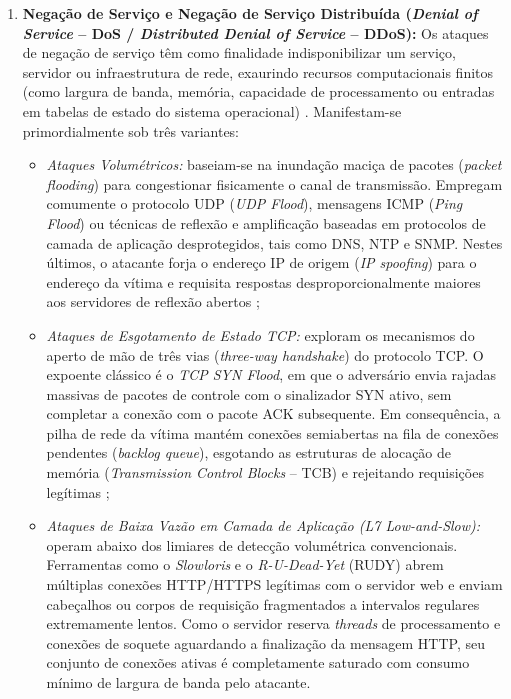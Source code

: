 \begin{enumerate}
    \item \textbf{Negação de Serviço e Negação de Serviço Distribuída (\emph{Denial of Service} -- DoS / \emph{Distributed Denial of Service} -- DDoS):}
    Os ataques de negação de serviço têm como finalidade indisponibilizar um serviço, servidor ou infraestrutura de rede, exaurindo recursos computacionais finitos (como largura de banda, memória, capacidade de processamento ou entradas em tabelas de estado do sistema operacional) \cite{Sharafaldin2018TowardGA}. Manifestam-se primordialmente sob três variantes:
    \begin{itemize}
        \item \emph{Ataques Volumétricos:} baseiam-se na inundação maciça de pacotes (\emph{packet flooding}) para congestionar fisicamente o canal de transmissão. Empregam comumente o protocolo UDP (\emph{UDP Flood}), mensagens ICMP (\emph{Ping Flood}) ou técnicas de reflexão e amplificação baseadas em protocolos de camada de aplicação desprotegidos, tais como DNS, NTP e SNMP. Nestes últimos, o atacante forja o endereço IP de origem (\emph{IP spoofing}) para o endereço da vítima e requisita respostas desproporcionalmente maiores aos servidores de reflexão abertos \cite{ciciot2023};
        \item \emph{Ataques de Esgotamento de Estado TCP:} exploram os mecanismos do aperto de mão de três vias (\emph{three-way handshake}) do protocolo TCP. O expoente clássico é o \emph{TCP SYN Flood}, em que o adversário envia rajadas massivas de pacotes de controle com o sinalizador SYN ativo, sem completar a conexão com o pacote ACK subsequente. Em consequência, a pilha de rede da vítima mantém conexões semiabertas na fila de conexões pendentes (\emph{backlog queue}), esgotando as estruturas de alocação de memória (\emph{Transmission Control Blocks} -- TCB) e rejeitando requisições legítimas \cite{Sharafaldin2018TowardGA};
        \item \emph{Ataques de Baixa Vazão em Camada de Aplicação (L7 Low-and-Slow):} operam abaixo dos limiares de detecção volumétrica convencionais. Ferramentas como o \emph{Slowloris} e o \emph{R-U-Dead-Yet} (RUDY) abrem múltiplas conexões HTTP/HTTPS legítimas com o servidor web e enviam cabeçalhos ou corpos de requisição fragmentados a intervalos regulares extremamente lentos. Como o servidor reserva \emph{threads} de processamento e conexões de soquete aguardando a finalização da mensagem HTTP, seu conjunto de conexões ativas é completamente saturado com consumo mínimo de largura de banda pelo atacante.
    \end{itemize}


\end{enumerate}
